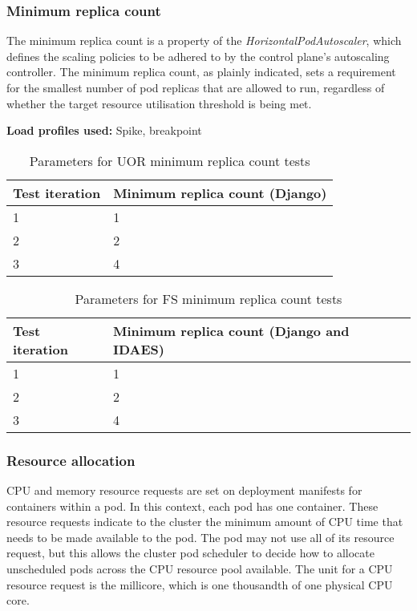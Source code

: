 \subsubsection{Minimum replica count}

The minimum replica count is a property of the \textit{HorizontalPodAutoscaler}, which defines the scaling policies to be adhered to by the control plane's autoscaling controller. The minimum replica count, as plainly indicated, sets a requirement for the smallest number of pod replicas that are allowed to run, regardless of whether the target resource utilisation threshold is being met.

\noindent\textbf{Load profiles used:} Spike, breakpoint

\begin{table}[h]
    \centering
    \begin{tabularx}{\textwidth}{|X|X|}
        \hline
        \textbf{Test iteration} & \textbf{Minimum replica count (Django)}  \\ \hline
        1 & 1 \\ \hline
        2 & 2 \\ \hline
        3 & 4 \\ \hline
    \end{tabularx}
    \caption{Parameters for UOR minimum replica count tests}
    \label{table:test-min-replica-count-uor}
\end{table}

\begin{table}[h]
    \centering
    \begin{tabularx}{\textwidth}{|X|X|}
        \hline
        \textbf{Test iteration} & \textbf{Minimum replica count (Django and IDAES)}  \\ \hline
        1 & 1 \\ \hline
        2 & 2 \\ \hline
        3 & 4 \\ \hline
    \end{tabularx}
    \caption{Parameters for FS minimum replica count tests}
    \label{table:test-min-replica-count-fs}
\end{table}

\subsubsection{Resource allocation}

CPU and memory resource requests are set on deployment manifests for containers within a pod. In this context, each pod has one container. These resource requests indicate to the cluster the minimum amount of CPU time  that needs to be made available to the pod. The pod may not use all of its resource request, but this allows the cluster pod scheduler to decide how to allocate unscheduled pods across the CPU resource pool available. The unit for a CPU resource request is the millicore, which is one thousandth of one physical CPU core.

